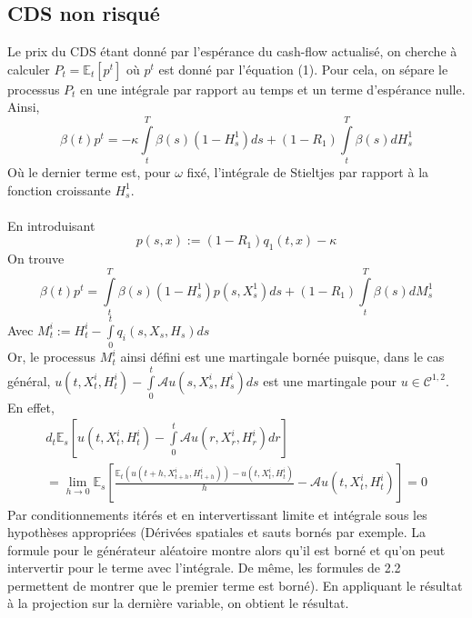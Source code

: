 \documentclass[a4paper]{article}
\begin{document}
\subsection{CDS non risqué}
Le prix du CDS étant donné par l'espérance du cash-flow actualisé, on cherche à calculer $P_{t} = \mathbb{E}_{t} \left[ p^{t} \right]$ où $p^{t}$ est donné par l'équation (1). Pour cela, on sépare le processus $P_{t}$ en une intégrale par rapport au temps et un terme d'espérance nulle.
Ainsi, \\
\begin{equation*}
\beta(t) p^t = -\kappa \int \limits_{t}^{T}\beta(s)(1-H^{1}_{s})ds + (1-R_{1})\int \limits_{t}^{T} \beta(s) dH_{s}^{1}
\end{equation*}
Où le dernier terme est, pour $\omega$ fixé, l'intégrale de Stieltjes par rapport à la fonction croissante $H^{1}_{s}$.\\ \\
En introduisant
\begin{equation*}
p(s, x) := (1-R_1)q_1(t,x) - \kappa
\end{equation*}
On trouve 
\begin{equation}
\beta(t) p^t  =  \int \limits_{t}^{T}\beta(s)(1-H^{1}_{s})p(s, X^{1}_s)ds + (1-R_{1})\int \limits_{t}^{T} \beta(s) dM_{s}^{1}
\end{equation}
Avec $M_t^i := H_t^i - \int \limits_0^t q_i (s, X_s, H_s) ds$ \\
Or, le processus $M_t^i$ ainsi défini est une martingale bornée puisque, dans le cas général, $u(t, X^i_t, H^i_t) - \int \limits_0^t \mathcal{A}u(s, X^i_s, H^i_s)ds$ est une martingale pour $u \in \mathcal{C}^{1, 2}$. \\
En effet,
\begin{multline*}
d_t\mathbb{E}_s \left[ u(t, X^i_t, H^i_t) - \int \limits_0^t \mathcal{A}u(r, X^i_r, H^i_r)dr \right] \\
= \lim \limits_{h \rightarrow 0} \mathbb{E}_s \left[ \frac{\mathbb{E}_t (u(t+h, X^i_{t+h}, H^i_{t+h})) - u(t, X^i_t, H^i_t)}{h} - \mathcal{A}u(t,X^i_t,H^i_t)\right]
= 0
\end{multline*}
Par conditionnements itérés et en intervertissant limite et intégrale sous les hypothèses appropriées (Dérivées spatiales et sauts bornés par exemple. La formule pour le générateur aléatoire montre alors qu'il est borné et qu'on peut intervertir pour le terme avec l'intégrale. De même, les formules de 2.2 permettent de montrer que le premier terme est borné). En appliquant le résultat à la projection sur la dernière variable, on obtient le résultat. \\ \\
\end{document}
